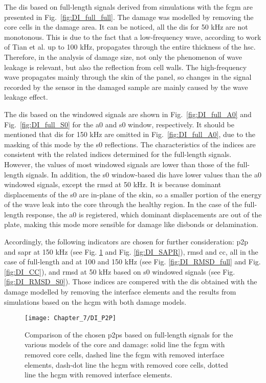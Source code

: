 The \acp{di} based on full-length signals derived from simulations with the \ac{fcgm} are presented in Fig.~\ref{fig:DI_full_full}.
The damage was modelled by removing the core cells in the damage area.
It can be noticed, all the \acp{di} for 50 \unit{\kHz} are not monotonous.
This is due to the fact that a low-frequency wave, according to work of Tian et al. \cite{tian2015wavenumber} up to 100 \unit{\kHz}, propagates through the entire thickness of the \ac{hsc}.
Therefore, in the analysis of damage size, not only the phenomenon of wave leakage is relevant, but also the reflection from cell walls.  
The high-frequency wave propagates mainly through the skin of the panel, so changes in the signal recorded by the sensor in the damaged sample are mainly caused by the wave leakage effect.

The \acp{di} based on the windowed signals are shown in Fig.~\ref{fig:DI_full_A0} and Fig.~\ref{fig:DI_full_S0} for the \ac{a0} and \ac{s0} window, respectively.
It should be mentioned that \acp{di} for 150 \unit{\kHz} are omitted in Fig.~\ref{fig:DI_full_A0}, due to the masking of this mode by the \ac{s0} reflections.
The characteristics of the indices are consistent with the related indices determined for the full-length signals.
However, the values of most windowed signals are lower than those of the full-length signals.
In addition, the \ac{s0} window-based \acp{di} have lower values than the \ac{a0} windowed signals, except the \ac{rmsd} at 50 \unit{kHz}.
It is because dominant displacements of the \ac{s0} are in-plane of the skin, so a smaller portion of the energy of the wave leak into the core through the healthy region.
In the case of the full-length response, the \ac{a0} is registered, which dominant displacements are out of the plate, making this mode more sensible for damage like disbonds or delamination.

Accordingly, the following indicators are chosen for further consideration: \ac{p2p} and \ac{sapr} at 150 \unit{kHz} (see Fig. \ref{fig:DI_P2P} and Fig. \ref{fig:DI_SAPR}), \ac{rmsd} and \ac{cc}, all in the case of full-length and at 100 and 150 \unit{\kHz} (see Fig. \ref{fig:DI_RMSD_full} and Fig. \ref{fig:DI_CC}), and \ac{rmsd} at 50 \unit{kHz} based on \ac{s0} windowed signals (see Fig. \ref{fig:DI_RMSD_S0}).
Those indices are compered with the \acp{di} obtained with the damage modelled by removing the interface elements and the results from simulations based on the \ac{hcgm} with both damage models.

\begin{figure}[!tbh]
	\begin{center}
		\texttt{[image: Chapter\_7/DI\_P2P]}
	\end{center}
	\caption{Comparison of the chosen \acfp{p2p} based on full-length signals for the various models of the core and damage: solid line the \acf{fcgm} with removed core cells, dashed line the \acf{fcgm} with removed interface elements, dash-dot line the \acf{hcgm} with removed core cells, dotted line the \acf{hcgm} with removed interface elements.}
	\label{fig:DI_P2P}
\end{figure}

